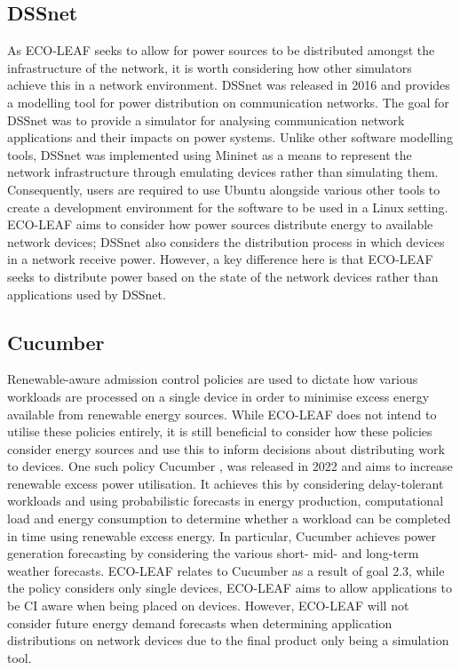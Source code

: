 \documentclass{l4proj}
\begin{document}
\subsection{DSSnet}
As ECO-LEAF seeks to allow for power sources to be distributed amongst the infrastructure of the network, it is worth considering how other simulators achieve this in a network environment.
DSSnet \citep{dssNet} was released in 2016 and provides a modelling tool for power distribution on communication networks.
The goal for DSSnet was to provide a simulator for analysing communication network applications and their impacts on power systems.
Unlike other software modelling tools, DSSnet was implemented using Mininet \citep{mininet} as a means to represent the network infrastructure through emulating devices rather than simulating them.
Consequently, users are required to use Ubuntu alongside various other tools to create a development environment for the software to be used in a Linux setting.
ECO-LEAF aims to consider how power sources distribute energy to available network devices; DSSnet also considers the distribution process in which devices in a network receive power.
However, a key difference here is that ECO-LEAF seeks to distribute power based on the state of the network devices rather than applications used by DSSnet.

\subsection{Cucumber}
Renewable-aware admission control policies are used to dictate how various workloads are processed on a single device in order to minimise excess energy available from renewable energy sources.
While ECO-LEAF does not intend to utilise these policies entirely, it is still beneficial to consider how these policies consider energy sources and use this to inform decisions about distributing work to devices.
One such policy Cucumber \citep{cucumber}, was released in 2022 and aims to increase renewable excess power utilisation.
It achieves this by considering delay-tolerant workloads and using probabilistic forecasts in energy production, computational load and energy consumption to determine whether a workload can be completed in time using renewable excess energy.
In particular, Cucumber achieves power generation forecasting by considering the various short- mid- and long-term weather forecasts.
ECO-LEAF relates to Cucumber as a result of goal 2.3, while the policy considers only single devices, ECO-LEAF aims to allow applications to be CI aware when being placed on devices.
However, ECO-LEAF will not consider future energy demand forecasts when determining application distributions on network devices due to the final product only being a simulation tool.
\end{document}

